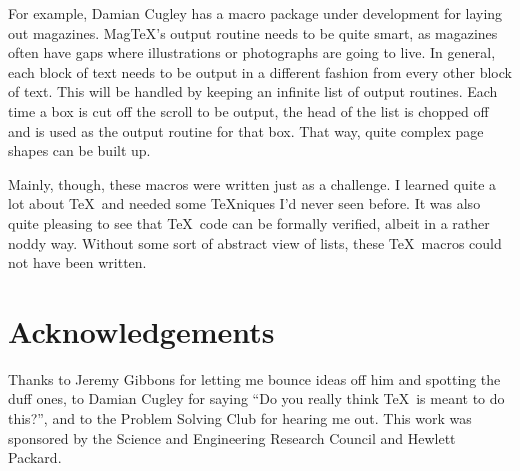 For example, Damian Cugley has a macro package under development for
laying out magazines.  {\sc Mag}\TeX's output routine needs to be quite
smart, as magazines often have gaps where illustrations or photographs
are going to live.  In general, each block of text needs to be output
in a different fashion from every other block of text.
This will be handled by keeping an infinite list of output
routines.  Each time a box is cut off the scroll to be output,
the head of the list is chopped off and is used as the output routine
for that box.  That way, quite complex page shapes can be built up.

Mainly, though, these macros were written just as a challenge.
I learned quite a lot about \TeX\ and needed some \TeX niques I'd
never seen before.  It was also quite pleasing to see that \TeX\ code
can be formally verified, albeit in a rather noddy way.  Without
some sort of abstract view of lists, these \TeX\ macros could
not have been written.

\section{Acknowledgements}

Thanks to Jeremy Gibbons for letting me bounce ideas off him
and spotting the duff ones,
to Damian Cugley for saying ``Do you really think \TeX\ is meant
to do this?'', and to the Problem Solving Club for hearing me out.
This work was sponsored by the Science and Engineering
Research Council and Hewlett Packard.



